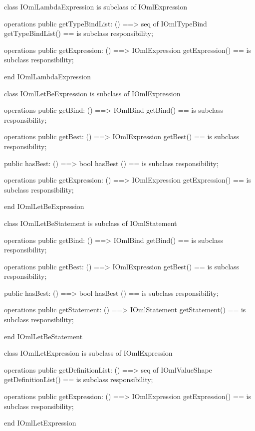 \begin{vdm_al}
class IOmlLambdaExpression
 is subclass of IOmlExpression

operations
  public getTypeBindList: () ==> seq of IOmlTypeBind
  getTypeBindList() == is subclass responsibility;

operations
  public getExpression: () ==> IOmlExpression
  getExpression() == is subclass responsibility;

end IOmlLambdaExpression
\end{vdm_al}

\begin{vdm_al}
class IOmlLetBeExpression
 is subclass of IOmlExpression

operations
  public getBind: () ==> IOmlBind
  getBind() == is subclass responsibility;

operations
  public getBest: () ==> IOmlExpression
  getBest() == is subclass responsibility;

  public hasBest: () ==> bool
  hasBest () == is subclass responsibility;

operations
  public getExpression: () ==> IOmlExpression
  getExpression() == is subclass responsibility;

end IOmlLetBeExpression
\end{vdm_al}

\begin{vdm_al}
class IOmlLetBeStatement
 is subclass of IOmlStatement

operations
  public getBind: () ==> IOmlBind
  getBind() == is subclass responsibility;

operations
  public getBest: () ==> IOmlExpression
  getBest() == is subclass responsibility;

  public hasBest: () ==> bool
  hasBest () == is subclass responsibility;

operations
  public getStatement: () ==> IOmlStatement
  getStatement() == is subclass responsibility;

end IOmlLetBeStatement
\end{vdm_al}

\begin{vdm_al}
class IOmlLetExpression
 is subclass of IOmlExpression

operations
  public getDefinitionList: () ==> seq of IOmlValueShape
  getDefinitionList() == is subclass responsibility;

operations
  public getExpression: () ==> IOmlExpression
  getExpression() == is subclass responsibility;

end IOmlLetExpression
\end{vdm_al}

